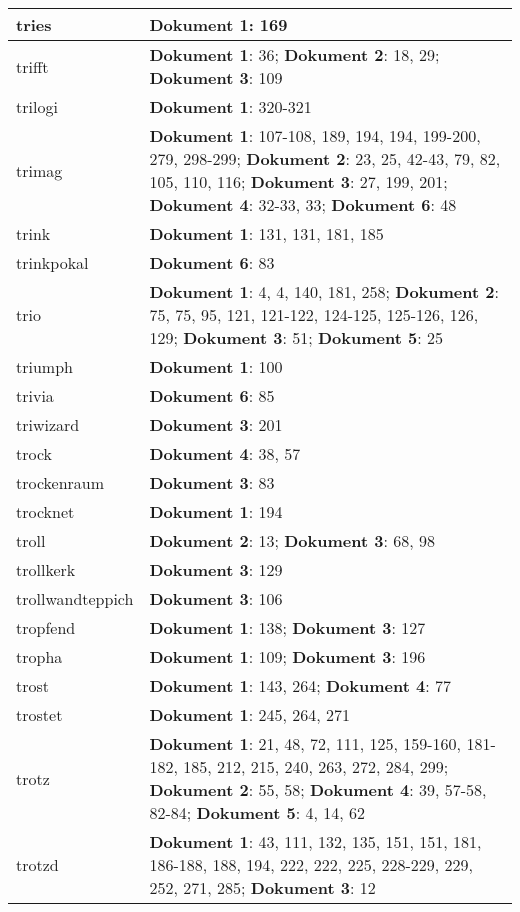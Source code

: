 \documentclass[a5paper]{article}
\begin{document}
\begin{longtable}[l]{|l|p{3in}|}
\hline
tries & \textbf{Dokument 1}: 169 \\
\hline
trifft & \textbf{Dokument 1}: 36; \textbf{Dokument 2}: 18, 29; \textbf{Dokument 3}: 109 \\
\hline
trilogi & \textbf{Dokument 1}: 320-321 \\
\hline
trimag & \textbf{Dokument 1}: 107-108, 189, 194, 194, 199-200, 279, 298-299; \textbf{Dokument 2}: 23, 25, 42-43, 79, 82, 105, 110, 116; \textbf{Dokument 3}: 27, 199, 201; \textbf{Dokument 4}: 32-33, 33; \textbf{Dokument 6}: 48 \\
\hline
trink & \textbf{Dokument 1}: 131, 131, 181, 185 \\
\hline
trinkpokal & \textbf{Dokument 6}: 83 \\
\hline
trio & \textbf{Dokument 1}: 4, 4, 140, 181, 258; \textbf{Dokument 2}: 75, 75, 95, 121, 121-122, 124-125, 125-126, 126, 129; \textbf{Dokument 3}: 51; \textbf{Dokument 5}: 25 \\
\hline
triumph & \textbf{Dokument 1}: 100 \\
\hline
trivia & \textbf{Dokument 6}: 85 \\
\hline
triwizard & \textbf{Dokument 3}: 201 \\
\hline
trock & \textbf{Dokument 4}: 38, 57 \\
\hline
trockenraum & \textbf{Dokument 3}: 83 \\
\hline
trocknet & \textbf{Dokument 1}: 194 \\
\hline
troll & \textbf{Dokument 2}: 13; \textbf{Dokument 3}: 68, 98 \\
\hline
trollkerk & \textbf{Dokument 3}: 129 \\
\hline
trollwandteppich & \textbf{Dokument 3}: 106 \\
\hline
tropfend & \textbf{Dokument 1}: 138; \textbf{Dokument 3}: 127 \\
\hline
tropha & \textbf{Dokument 1}: 109; \textbf{Dokument 3}: 196 \\
\hline
trost & \textbf{Dokument 1}: 143, 264; \textbf{Dokument 4}: 77 \\
\hline
trostet & \textbf{Dokument 1}: 245, 264, 271 \\
\hline
trotz & \textbf{Dokument 1}: 21, 48, 72, 111, 125, 159-160, 181-182, 185, 212, 215, 240, 263, 272, 284, 299; \textbf{Dokument 2}: 55, 58; \textbf{Dokument 4}: 39, 57-58, 82-84; \textbf{Dokument 5}: 4, 14, 62 \\
\hline
trotzd & \textbf{Dokument 1}: 43, 111, 132, 135, 151, 151, 181, 186-188, 188, 194, 222, 222, 225, 228-229, 229, 252, 271, 285; \textbf{Dokument 3}: 12 \\

\end{longtable}
\end{document}
